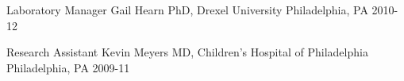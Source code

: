 

\begin{cvhonors}

    \cvhonor
    {Laboratory Manager} %
    {Gail Hearn PhD, Drexel University} %
    {Philadelphia, PA} %
    {2010-12} %

    \cvhonor
    {Research Assistant} %
    {Kevin Meyers MD, Children's Hospital of Philadelphia} %
    {Philadelphia, PA} %
    {2009-11} %
  
\end{cvhonors}
